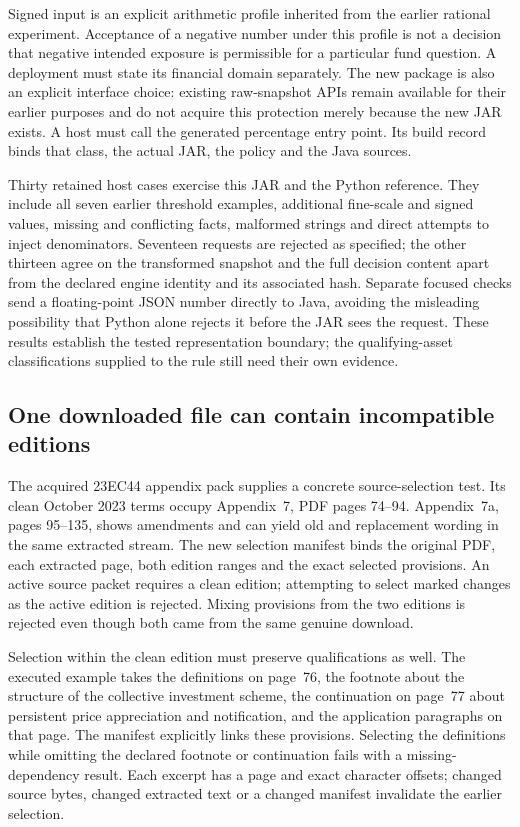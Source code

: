 Signed input is an explicit arithmetic profile inherited from the earlier
rational experiment. Acceptance of a negative number under this profile is
not a decision that negative intended exposure is permissible for a particular
fund question. A deployment must state its financial domain separately. The
new package is also an explicit interface choice: existing raw-snapshot APIs
remain available for their earlier purposes and do not acquire this protection
merely because the new JAR exists. A host must call the generated percentage
entry point. Its build record binds that class, the actual JAR, the policy and
the Java sources.

Thirty retained host cases exercise this JAR and the Python reference. They
include all seven earlier threshold examples, additional fine-scale and signed
values, missing and conflicting facts, malformed strings and direct attempts
to inject denominators. Seventeen requests are rejected as specified; the
other thirteen agree on the transformed snapshot and the full decision content
apart from the declared engine identity and its associated hash. Separate
focused checks send a floating-point JSON number directly to Java, avoiding
the misleading possibility that Python alone rejects it before the JAR sees
the request. These results establish the tested representation boundary; the
qualifying-asset classifications supplied to the rule still need their own
evidence.

\subsection{One downloaded file can contain incompatible editions}

The acquired 23EC44 appendix pack supplies a concrete source-selection test.
Its clean October 2023 terms occupy Appendix~7, PDF pages 74--94. Appendix~7a,
pages 95--135, shows amendments and can yield old and replacement wording in
the same extracted stream. The new selection manifest binds the original PDF,
each extracted page, both edition ranges and the exact selected provisions.
An active source packet requires a clean edition; attempting to select marked
changes as the active edition is rejected. Mixing provisions from the two
editions is rejected even though both came from the same genuine download.

Selection within the clean edition must preserve qualifications as well. The
executed example takes the definitions on page~76, the footnote about the
structure of the collective investment scheme, the continuation on page~77
about persistent price appreciation and notification, and the application
paragraphs on that page. The manifest explicitly links these provisions.
Selecting the definitions while omitting the declared footnote or continuation
fails with a missing-dependency result. Each excerpt has a page and exact
character offsets; changed source bytes, changed extracted text or a changed
manifest invalidate the earlier selection.

